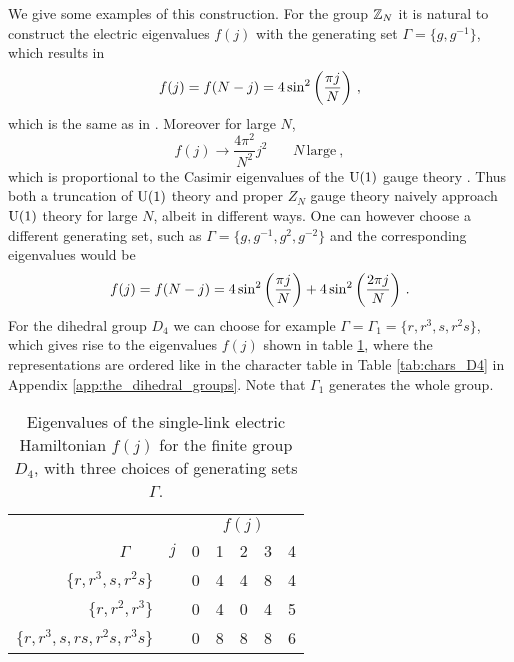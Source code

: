 We give some examples of this construction.
For the group $\mathbb{Z}_N$ it is natural to construct the electric eigenvalues $f(j)$ with the generating set $\Gamma = \{g, g^{-1}\}$, which results in
\begin{equation}
    \label{eq:fj ZN}
    f(j)=f(N-j) = 4\sin^2\pqty{\frac{\pi j}{N}} \ ,
\end{equation}
which is the same as in \cite{Ercoetal1}.
Moreover for large $N$,
\begin{equation}
    f(j) \to \frac{4\pi^2}{N^2} j^2\,\,\,\,\,\,\,\,\,\,\,N\,\mathrm{large} \ ,
\end{equation}
which is proportional to the Casimir eigenvalues of the $\mathrm{U}(1)$ gauge theory \cite{Ercoetal2}.
Thus both a truncation of $\mathrm{U}(1)$ theory and proper $Z_N$ gauge theory naively approach $\mathrm{U}(1)$ theory for large $N$, albeit in different ways.
One can however choose a different generating set, such as $\Gamma = \{g, g^{-1},g^2, g^{-2}\}$ and the corresponding eigenvalues would be
\begin{equation}
    f(j)=f(N-j) = 4\sin^2\pqty{\frac{\pi j}{N}}+4\sin^2\pqty{\frac{2\pi j}{N}} \ .
\end{equation}
For the dihedral group $D_4$ we can choose for example $\Gamma = \Gamma_1 = \{r,r^3,s,r^2s\}$, which gives rise to the eigenvalues $f(j)$  shown in table \ref{tab:fval}, where the representations are ordered like in the character table in Table \ref{tab:chars_D4} in Appendix \ref{app:the_dihedral_groups}.
Note that $\Gamma_1$ generates the whole group.

\begin{table}[t]
    \centering
    \begin{tabular}{rcccccc}
        \toprule
         & & \multicolumn{5}{c}{$f(j)$} \\
        \cmidrule(l){3-7}
        $\Gamma$~~~ & $j$ & 0 & 1 & 2 & 3 & 4\\
        \midrule
        $\{r, r^3, s, r^2 s \}$
                 & & 0 & 4 & 4 & 8 & 4 \\[5pt]
        $\{r, r^2, r^3 \}$
                 & & 0 & 4 & 0 & 4 & 5 \\[5pt]
        $\{r, r^3, s, r s, r^2 s, r^3 s \}$
                       & & 0 & 8 & 8 & 8 & 6 \\
        \bottomrule
    \end{tabular}
    \caption{Eigenvalues of the single-link electric Hamiltonian $f(j)$ for the finite group $D_4$, with three choices of generating sets $\Gamma$.}
    \label{tab:fval}
\end{table}


